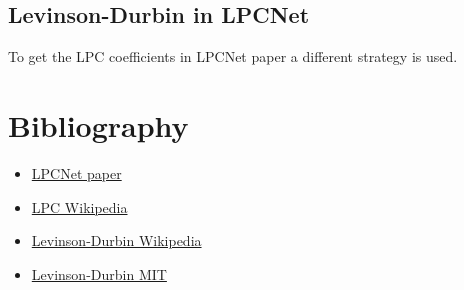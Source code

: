 \documentclass{article}
\begin{document}
\subsection{Levinson-Durbin in LPCNet}
\quad To get the LPC coefficients in LPCNet paper a different strategy is used.

\newpage
\section{Bibliography}

\begin{itemize}
    \item \href{https://arxiv.org/pdf/1810.11846}{LPCNet paper}
    \item \href{https://en.wikipedia.org/wiki/Linear_predictive_coding}{LPC Wikipedia}
    \item \href{https://en.wikipedia.org/wiki/Levinson_recursion}{Levinson-Durbin Wikipedia}
    \item \href{https://ocw.mit.edu/courses/6-341-discrete-time-signal-processing-fall-2005/06e8ddb9555ede1b094f5dc9d17ea254_lec13.pdf}{Levinson-Durbin MIT}
\end{itemize}
\end{document}
